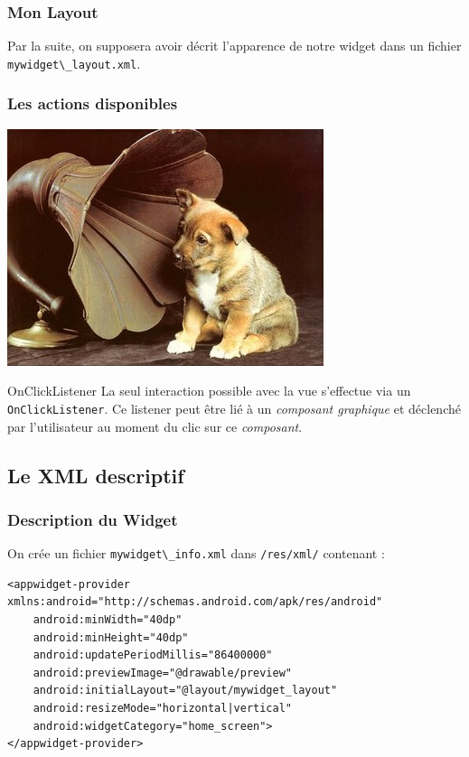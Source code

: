 \documentclass{beamer}
\begin{document}
\begin{frame}
\frametitle{Mon Layout}
Par la suite, on supposera avoir décrit l'apparence de notre widget dans un fichier \verb!mywidget\_layout.xml!.
\end{frame}


\begin{frame}
\frametitle{Les actions disponibles}
\begin{center}
\includegraphics[scale=0.35]{listener.jpg}
\end{center}
\begin{block}{OnClickListener}
La seul interaction possible avec la vue s'effectue via un \verb!OnClickListener!. Ce listener peut être lié à un \emph{composant graphique} et déclenché par l'utilisateur au moment du clic sur ce \emph{composant}.
\end{block}
\end{frame}

\subsection{Le XML descriptif}

\begin{frame}[fragile]
\frametitle{Description du Widget}

\begin{exampleblock}{On crée un fichier \verb!mywidget\_info.xml! dans \verb!/res/xml/! contenant : }
\lstset{language=xml}
\begin{lstlisting}
<appwidget-provider xmlns:android="http://schemas.android.com/apk/res/android"
    android:minWidth="40dp"
    android:minHeight="40dp"
    android:updatePeriodMillis="86400000"
    android:previewImage="@drawable/preview"
    android:initialLayout="@layout/mywidget_layout"
    android:resizeMode="horizontal|vertical"
    android:widgetCategory="home_screen">
</appwidget-provider>
\end{lstlisting}
\end{exampleblock}
\end{frame}
\end{document}
